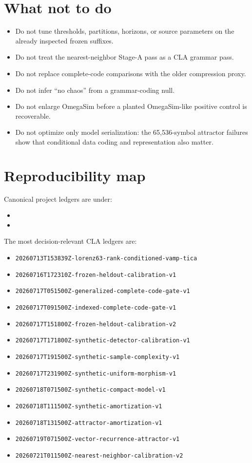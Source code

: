 \documentclass[10pt]{article}
\begin{document}
\section{What not to do}

\begin{itemize}
\item Do not tune thresholds, partitions, horizons, or source parameters on
the already inspected frozen suffixes.
\item Do not treat the nearest-neighbor Stage-A pass as a CLA grammar pass.
\item Do not replace complete-code comparisons with the older compression
proxy.
\item Do not infer ``no chaos'' from a grammar-coding null.
\item Do not enlarge OmegaSim before a planted OmegaSim-like positive control
is recoverable.
\item Do not optimize only model serialization: the 65,536-symbol attractor
failures show that conditional data coding and representation also matter.
\end{itemize}

\section{Reproducibility map}

Canonical project ledgers are under:
\begin{itemize}
\item {}
\item {}
\end{itemize}

The most decision-relevant CLA ledgers are:
\begin{itemize}
\item \texttt{20260713T153839Z-lorenz63-rank-conditioned-vamp-tica}
\item \texttt{20260716T172310Z-frozen-heldout-calibration-v1}
\item \texttt{20260717T051500Z-generalized-complete-code-gate-v1}
\item \texttt{20260717T091500Z-indexed-complete-code-gate-v1}
\item \texttt{20260717T151800Z-frozen-heldout-calibration-v2}
\item \texttt{20260717T171800Z-synthetic-detector-calibration-v1}
\item \texttt{20260717T191500Z-synthetic-sample-complexity-v1}
\item \texttt{20260717T231900Z-synthetic-uniform-morphism-v1}
\item \texttt{20260718T071500Z-synthetic-compact-model-v1}
\item \texttt{20260718T111500Z-synthetic-amortization-v1}
\item \texttt{20260718T131500Z-attractor-amortization-v1}
\item \texttt{20260719T071500Z-vector-recurrence-attractor-v1}
\item \texttt{20260721T011500Z-nearest-neighbor-calibration-v2}
\end{itemize}
\end{document}
